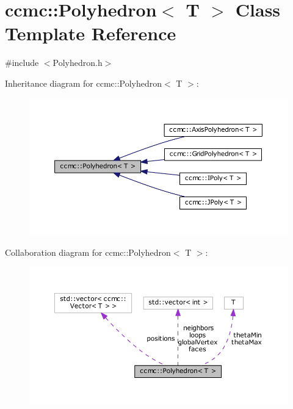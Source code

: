 \hypertarget{classccmc_1_1_polyhedron}{\section{ccmc\-:\-:Polyhedron$<$ T $>$ Class Template Reference}
\label{classccmc_1_1_polyhedron}
}


{\ttfamily \#include $<$Polyhedron.\-h$>$}



Inheritance diagram for ccmc\-:\-:Polyhedron$<$ T $>$\-:
\nopagebreak
\begin{figure}[H]
\begin{center}
\leavevmode
\includegraphics[width=350pt]{classccmc_1_1_polyhedron__inherit__graph}
\end{center}
\end{figure}


Collaboration diagram for ccmc\-:\-:Polyhedron$<$ T $>$\-:
\nopagebreak
\begin{figure}[H]
\begin{center}
\leavevmode
\includegraphics[width=350pt]{classccmc_1_1_polyhedron__coll__graph}
\end{center}
\end{figure}
